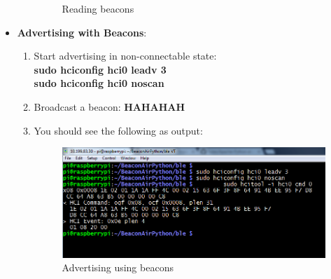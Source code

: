 \begin{itemize}
\begin{enumerate}
\begin{figure}[ht]
					\caption{Reading beacons}
				\end{figure}
		\end{enumerate}
	\item \textbf{Advertising with Beacons}:
		\begin{enumerate}
			\item Start advertising in non-connectable state:\\
				\textbf{sudo hciconfig hci0 leadv 3}\\
				\textbf{sudo hciconfig hci0 noscan}
			\item Broadcast a beacon:
				\textbf{HAHAHAH}
			\item You should see the following as output:
				\begin{figure}[ht]
					\centering
					\includegraphics[scale=0.5]{images/advertising_beacons.png}
					\caption{Advertising using beacons}
				\end{figure}
		\end{enumerate}
\end{itemize}


